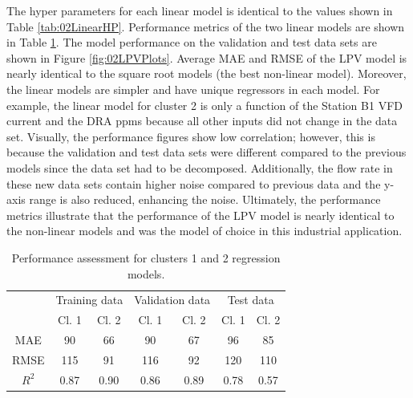 The hyper parameters for each linear model is identical to the values shown in Table \ref{tab:02LinearHP}. Performance metrics of the two linear models are shown in Table \ref{tab:02LPVPE}.  The model performance on the validation and test data sets are shown in Figure \ref{fig:02LPVPlots}. Average MAE and RMSE of the LPV model is nearly identical to the square root models (the best non-linear model).  Moreover, the linear models are simpler and have unique regressors in each model.  For example, the linear model for cluster 2 is only a function of the Station B1 VFD current and the DRA ppms because all other inputs did not change in the data set.  Visually, the performance figures show low correlation; however, this is because the validation and test data sets were different compared to the previous models since the data set had to be decomposed.  Additionally, the flow rate in these new data sets contain higher noise compared to previous data and the y-axis range is also reduced, enhancing the noise. Ultimately, the performance metrics illustrate that the performance of the LPV model is nearly identical to the non-linear models and was the model of choice in this industrial application.

\begin{table}[h]
    \centering
    {
    \begin{tabular}{c|c|c|c|c|c|c|}
      & \multicolumn{2}{c|}{Training data} & \multicolumn{2}{c|}{Validation data} & \multicolumn{2}{c|}{Test data} \\ \cline{2-7} 
      & Cl. 1            & Cl. 2           & Cl. 1             & Cl. 2            & Cl. 1          & Cl. 2         \\ \hline
    MAE   & 90               & 66              & 90                & 67               & 96             & 85            \\
    RMSE  & 115              & 91              & 116               & 92               & 120            & 110           \\
    $R^2$ & 0.87             & 0.90            & 0.86              & 0.89             & 0.78           & 0.57         
    \end{tabular}}
    \caption{Performance assessment for clusters 1 and 2 regression models.}
    \label{tab:02LPVPE}
\end{table}

